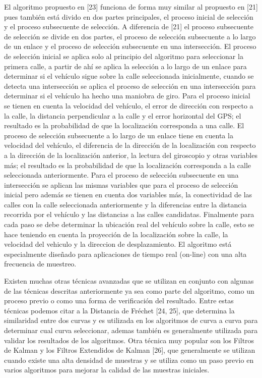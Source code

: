\documentclass[final,fmstyle]{fpunathesis}
\begin{document}
El algoritmo propuesto en [23] funciona de forma muy similar al propuesto en [21] pues también está divido en dos partes principales, el proceso inicial de selección y el proceso subsecuente de selección. A diferencia de [21] el proceso subsecuente de selección se divide en dos partes, el proceso de selección subsecuente a lo largo de un enlace y el proceso de selección subsecuente en una intersección. El proceso de selección inicial se aplica solo al principio del algoritmo para seleccionar la primera calle, a partir de ahí se aplica la  selección a lo largo de un enlace para determinar si el vehículo sigue sobre la calle seleccionada inicialmente, cuando se detecta una intersección se aplica el proceso de selección en una intersección para determinar si el vehículo ha hecho una maniobra de giro. Para el proceso inicial se tienen en cuenta la velocidad del vehículo, el error de dirección con respecto a la calle, la distancia perpendicular a la calle y el error horizontal del GPS; el resultado es la probabilidad de que la localización corresponda a una calle. El proceso de selección subsecuente a lo largo de un enlace tiene en cuenta la velocidad del vehículo, el diferencia de la dirección de la localización con respecto a la dirección de la localización anterior, la lectura del giroscopio y otras variables más; el resultado es la probabilidad de que la localización corresponda a la calle seleccionada anteriormente. Para el proceso de selección subsecuente en una intersección se aplican las mismas variables que para el proceso de selección inicial pero además se tienen en cuenta dos variables más, la conectividad de las calles con la calle seleccionada anteriormente y la diferencias entre la distancia recorrida por el vehículo y las distancias a las calles candidatas. Finalmente para cada paso se debe determinar la ubicación real del vehículo sobre la calle, esto se hace teniendo en cuenta la proyección de la localización sobre la calle, la velocidad del vehiculo y la direccion de desplazamiento. El algoritmo está especialmente diseñado para aplicaciones de tiempo real (on-line) con una alta frecuencia de muestreo.

Existen muchas otras técnicas avanzadas que se utilizan en conjunto con algunas de las técnicas descritas anteriormente ya sea como parte del algoritmo, como un proceso previo o como una forma de verificación del resultado. Entre estas técnicas podemos citar a la Distancia de Fréchet [24, 25], que determina la similaridad entre dos curvas y es utilizada en los algoritmos de curva a curva para determinar cual curva seleccionar, ademas también es generalmente utilizada para validar los resultados de los algoritmos. Otra técnica muy popular son los Filtros de Kalman y los Filtros Extendidos de Kalman [26], que generalmente se utilizan cuando existe una alta densidad de muestras y se utiliza como un paso previo en varios algoritmos para mejorar la calidad de las muestras iniciales.
\end{document}
